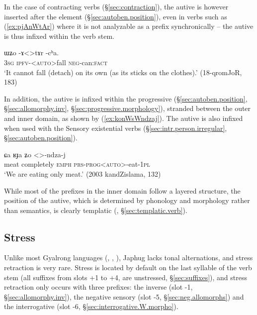 In the case of contracting verbs (§\ref{sec:contraction}), the autive is however inserted after the  element (§\ref{sec:autoben.position}), even in verbs such as   (\ref{ex:pjAnWtAr}) where it is not analyzable as a prefix synchronically -- the autive is thus infixed within the verb stem.

\begin{exe}
\ex \label{ex:pjAnWtAr}
\gll ɯʑo -ɤ<>tɤr -cʰa. \\
\textsc{3sg} \textsc{ipfv}-<\textsc{auto}>fall \textsc{neg}-can:\textsc{fact} \\
\glt `It cannot fall (detach) on its own (as its sticks on the clothes).' (18-qromJoR, 183)
\end{exe}

In addition, the autive is infixed within the progressive  (§\ref{sec:autoben.position}, §\ref{sec:allomorphy.inv}, §\ref{sec:progressive.morphology}), stranded between the outer and inner domain, as shown by (\ref{ex:konWsWndzaj}). The autive is also infixed when used with the Sensory existential verbs (§\ref{sec:intr.person.irregular}, §\ref{sec:autoben.position}).

\begin{exe}
\ex \label{ex:konWsWndzaj}
\gll ɕa ʁɟa ʑo <>-ndza-j \\
meat completely \textsc{emph} \textsc{prs}-\textsc{prog}<\textsc{auto}>-eat-\textsc{1pl} \\
\glt `We are eating only meat.' (2003 kandZislama, 132)
\end{exe}

While most of the prefixes in the inner domain follow a layered structure, the position of the autive, which is determined by phonology and morphology rather than semantics, is clearly templatic (\citealt[218]{bickel07inflectional}, §\ref{sec:templatic.verb}).

 

\subsection{Stress} \label{sec:stress.prefixal.chain}
Unlike most Gyalrong languages (\citealt{jackson05yingao}, \citealt{linyj12tone}, \citealt[69--81]{gong18these}), Japhug lacks tonal alternations, and stress retraction is very rare. Stress is located by default on the last syllable of the verb stem (all suffixes from slots +1 to +4, are unstressed, §\ref{sec:suffixes}), and stress retraction only occurs with three prefixes: the inverse   (slot -1, §\ref{sec:allomorphy.inv}), the  negative sensory  (slot -5, §\ref{sec:neg.allomorphs}) and the interrogative  (slot -6, §\ref{sec:interrogative.W.morpho}).

